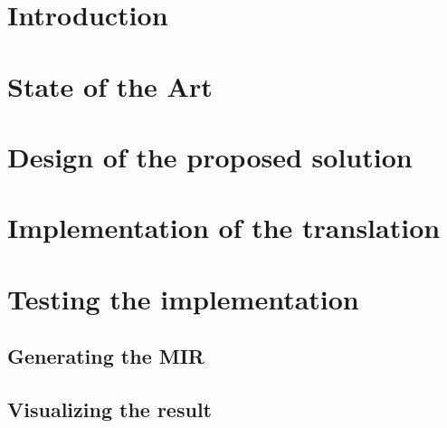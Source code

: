 \documentclass[12pt, oneside]{book}
\begin{document}




\chapter{Introduction}









\chapter{State of the Art}







\chapter{Design of the proposed solution}







\chapter{Implementation of the translation}








\chapter{Testing the implementation}

\section{Generating the MIR}
\section{Visualizing the result}
\end{document}

